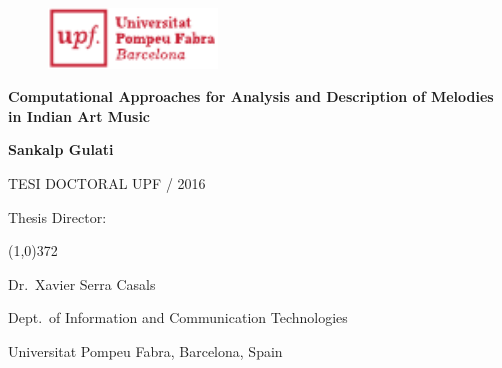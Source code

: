 
\newpage
\thispagestyle{empty}
\begin{titlingpage}
\begin{flushright}

  \begin{figure}[t]
    \begin{flushright}
      \includegraphics[width=4.5cm]{ch00/figures/upf-logo-bo}
    \end{flushright}
  \end{figure}

  \vspace*{2.2cm} 

  {\huge \textbf{Computational Approaches for Analysis and Description of Melodies in Indian Art Music}}
  
  \vspace*{2cm}

  {\Large \textbf{Sankalp Gulati}}
  
  \vspace*{\fill} 
  TESI DOCTORAL UPF / 2016

\end{flushright}
  
  \vspace*{1.5cm}

  Thesis Director:

  \vspace*{-0.25cm}

  \line(1,0){372}
  
  \vspace*{0.25cm}

  Dr.~Xavier Serra Casals

  Dept.~of Information and Communication Technologies

  Universitat Pompeu Fabra, Barcelona, Spain
  
\end{titlingpage}

